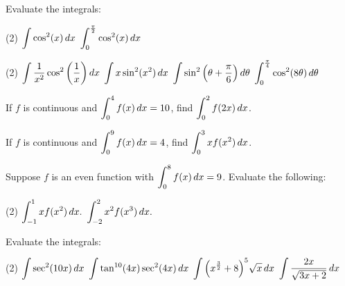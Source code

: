 \documentclass[../mathNotesPreamble]{subfiles}
\begin{document}
  \begin{center}
  \end{center}
  \begin{ex*}
    Evaluate the integrals:
  \end{ex*}
  \begin{tasks}[after-item-skip=\stretch{1}](2)
    \task $\displaystyle\int \cos^2(x)\,dx$
    \task $\displaystyle\int_{0}^{\frac{\pi}{2}}\cos^2(x)\,dx$
  \end{tasks}
  \pagebreak
  
  \begin{tasks}[after-item-skip=\stretch{1}, resume](2)
    \task $\displaystyle\int \frac{1}{x^2}\cos^2{\left(\frac{1}{x}\right)}\,dx$
    \task $\displaystyle\int x\sin^2(x^2)\,dx$
    \task $\displaystyle\int \sin^2{\left(\theta+\frac{\pi}{6}\right)}\,d\theta$
    \task $\displaystyle\int_{0}^{\frac{\pi}{4}} \cos^2(8\theta)\,d\theta$
  \end{tasks}
  \pagebreak
  
  \begin{ex*}
    If $f$ is continuous and $\displaystyle\int_0^4 f(x)\,dx=10$, find $\displaystyle\int_0^2 f(2x)\,dx$.
  \end{ex*}
  
  \begin{ex*}
    If $f$ is continuous and $\displaystyle\int_0^9 f(x)\,dx=4$, find $\displaystyle\int_0^3 xf(x^2)\,dx$.
  \end{ex*}
  
  \begin{ex*}
    Suppose $f$ is an even function with $\displaystyle\int_0^8 f(x)\,dx=9$. Evaluate the following:
  \end{ex*}
  \begin{tasks}(2)
    \task $\displaystyle\int_{-1}^1 x f(x^2)\,dx.$
    \task $\displaystyle\int_{-2}^2 x^2 f(x^3)\,dx.$
  \end{tasks}
  \pagebreak
  
  \begin{ex*}
    Evaluate the integrals:
  \end{ex*}
  \begin{tasks}[after-item-skip=\stretch{1}](2)
    \task $\displaystyle\int \sec^2(10x)\,dx$
    \task $\displaystyle\int \tan^{10}(4x)\sec^2(4x)\,dx$
    \task $\displaystyle\int{\left(x^\frac{3}{2}+8\right)}^5\sqrt{x}\,dx$
    \task $\displaystyle\int \frac{2x}{\sqrt{3x+2}}\,dx$
  \end{tasks}
  \pagebreak
  
\end{document}
